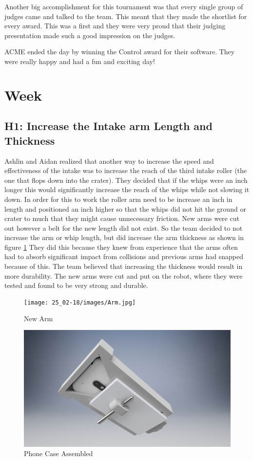 \documentclass{article}
\begin{document}
Another big accomplishment for this tournament was that every single group of judges came and talked to the team. This meant that they made the shortlist for every award. This was a first and they were very proud that their judging presentation made such a good impression on the judges. 

ACME ended the day by winning the Control award for their software. They were really happy and had a fun and exciting day!
\clearpage \newpage \section{Week \thesection} 
\subsection{H1: Increase the Intake arm Length and Thickness}

Ashlin and Aidan realized that another way to increase the speed and effectiveness of the intake was to increase the reach of the third intake roller (the one that flops down into the crater). They decided that if the whips were an inch longer this would significantly increase the reach of the whips while not slowing it down. In order for this to work the roller arm need to be increase an inch in length and positioned an inch higher so that the whips did not hit the ground or crater to much that they might cause unnecessary friction. New arms were cut out however a belt for the new length did not exist. So the team decided to not increase the arm or whip length, but did increase the arm thickness as shown in figure \ref{fig:arm} They did this because they knew from experience that the arms often had to absorb significant impact from collisions and previous arms had snapped because of this. The team believed that increasing the thickness would result in more durability. The new arms were cut and put on the robot, where they were tested and found to be very strong and durable.

\begin{figure}
    \centering
    \texttt{[image: 25\_02-18/images/Arm.jpg]}
    \caption{New Arm}
    \label{fig:arm}
\end{figure}

\begin{figure}
    \centering
    \includegraphics[width= 0.5 \textwidth]{25_02-18/images/phoneMount.png}
    \caption{Phone Case Assembled}
    \label{fig: phone case}
\end{figure}
\end{document}
